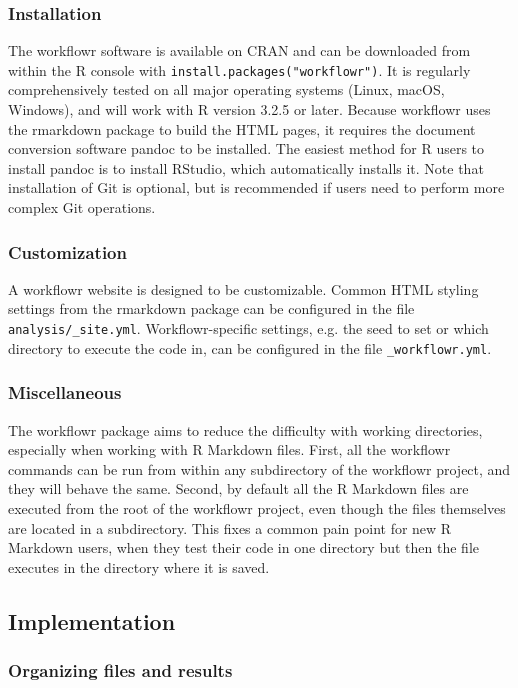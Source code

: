 \documentclass[9pt,a4paper]{extarticle}
\begin{document}
\subsubsection*{Installation}

The workflowr software is available on CRAN and can be downloaded from
within the R console with \verb|install.packages("workflowr")|. It is
regularly comprehensively tested on all major operating systems (Linux,
macOS, Windows), and will work with R version 3.2.5 or later. Because
workflowr uses the rmarkdown package to build the HTML pages, it
requires the document conversion software pandoc to be installed. The
easiest method for R users to install pandoc is to install RStudio,
which automatically installs it. Note that installation of Git is
optional, but is recommended if users need to perform more complex Git
operations.

\subsubsection*{Customization}

A workflowr website is designed to be customizable. Common HTML styling
settings from the rmarkdown package can be configured in the file
\verb|analysis/_site.yml|. Workflowr-specific settings, e.g. the seed to
set or which directory to execute the code in, can be configured in the
file \verb|_workflowr.yml|.

\subsubsection*{Miscellaneous}

The workflowr package aims to reduce the difficulty with working
directories, especially when working with R Markdown files. First, all
the workflowr commands can be run from within any subdirectory of the
workflowr project, and they will behave the same. Second, by default all
the R Markdown files are executed from the root of the workflowr
project, even though the files themselves are located in a subdirectory.
This fixes a common pain point for new R Markdown users, when they test
their code in one directory but then the file executes in the directory
where it is saved.

\subsection*{Implementation}

\subsubsection*{Organizing files and results}
\end{document}
